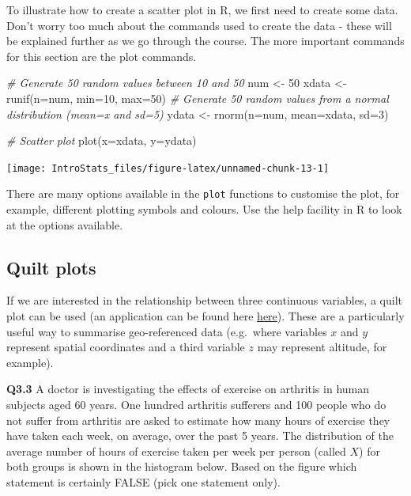 \documentclass[
  oneside]{krantz}
\newenvironment{Shaded}{\begin{snugshade}}{\end{snugshade}}
\newcommand{\AttributeTok}[1]{\textcolor[rgb]{0.77,0.63,0.00}{#1}}
\newcommand{\CommentTok}[1]{\textcolor[rgb]{0.56,0.35,0.01}{\textit{#1}}}
\newcommand{\DecValTok}[1]{\textcolor[rgb]{0.00,0.00,0.81}{#1}}
\newcommand{\FunctionTok}[1]{\textcolor[rgb]{0.00,0.00,0.00}{#1}}
\newcommand{\NormalTok}[1]{#1}
\newcommand{\OtherTok}[1]{\textcolor[rgb]{0.56,0.35,0.01}{#1}}
\begin{document}
To illustrate how to create a scatter plot in R, we first need to create some data. Don't worry too much about the commands used to create the data - these will be explained further as we go through the course. The more important commands for this section are the plot commands.

\begin{Shaded}
\begin{Highlighting}[]
\CommentTok{\# Generate 50 random values between 10 and 50}
\NormalTok{num }\OtherTok{\textless{}{-}} \DecValTok{50}
\NormalTok{xdata }\OtherTok{\textless{}{-}} \FunctionTok{runif}\NormalTok{(}\AttributeTok{n=}\NormalTok{num, }\AttributeTok{min=}\DecValTok{10}\NormalTok{, }\AttributeTok{max=}\DecValTok{50}\NormalTok{)}
\CommentTok{\# Generate 50 random values from a normal distribution (mean=x and sd=5)}
\NormalTok{ydata }\OtherTok{\textless{}{-}} \FunctionTok{rnorm}\NormalTok{(}\AttributeTok{n=}\NormalTok{num, }\AttributeTok{mean=}\NormalTok{xdata, }\AttributeTok{sd=}\DecValTok{3}\NormalTok{)}

\CommentTok{\# Scatter plot}
\FunctionTok{plot}\NormalTok{(}\AttributeTok{x=}\NormalTok{xdata, }\AttributeTok{y=}\NormalTok{ydata)}
\end{Highlighting}
\end{Shaded}

\begin{center}\texttt{[image: IntroStats\_files/figure-latex/unnamed-chunk-13-1]} \end{center}

There are many options available in the \texttt{plot} functions to customise the plot, for example, different plotting symbols and colours. Use the help facility in R to look at the options available.

\hypertarget{quilt-plots}{%
\subsection{Quilt plots}\label{quilt-plots}}

If we are interested in the relationship between three continuous variables, a quilt plot can be used (an application can be found here \href{https://europepmc.org/article/med/24454789}{here}). These are a particularly useful way to summarise geo-referenced data (e.g.~where variables \(x\) and \(y\) represent spatial coordinates and a third variable \(z\) may represent altitude, for example).

\textbf{Q3.3} A doctor is investigating the effects of exercise on arthritis in human subjects aged 60 years. One hundred arthritis sufferers and 100 people who do not suffer from arthritis are asked to estimate how many hours of exercise they have taken each week, on average, over the past 5 years. The distribution of the average number of hours of exercise taken per week per person (called \(X\)) for both groups is shown in the histogram below. Based on the figure which statement is certainly FALSE (pick one statement only).
\end{document}
